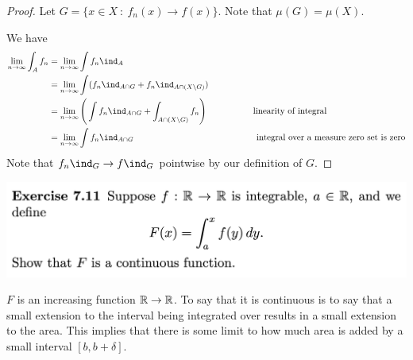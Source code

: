 \begin{proof}
  Let $G = \{x \in X ~:~ f_n(x) \to f(x)\}$. Note that $\mu(G) = \mu(X)$.

  We have
  \begin{align*}
    \limn \int_A f_n
    &= \limn \int f_n \ind_{A} \\
    &= \limn \int (f_n \ind_{A \cap G} + f_n \ind_{A \cap (X \setminus G)}) \\
    &= \limn \Bigg(\int f_n \ind_{A \cap G} + \int_{A \cap (X \setminus G)} f_n\Bigg) ~~~~~~~~~~~~~~~~\text{linearity of integral}\\
    &= \limn \int f_n \ind_{A \cap G} ~~~~~~~~~~~~~~~~~~~~~~~~~~~~~~~~~~~~~~~~~~\text{integral over a measure zero set is zero}\\
  \end{align*}
  Note that $f_n\ind_G \to f\ind_G$ pointwise by our definition of $G$.

\end{proof}


\begin{mdframed}
\includegraphics[width=400pt]{img/analysis--berkeley-202a-hw08-d0c0.png}
\end{mdframed}

\begin{intuition*}
  $F$ is an increasing function $\mathbb{R} \to \mathbb{R}$. To say that it is continuous is to say that a small extension to
  the interval being integrated over results in a small extension to the area. This implies that there is some
  limit to how much area is added by a small interval $[b, b + \delta]$.
\end{intuition*}

